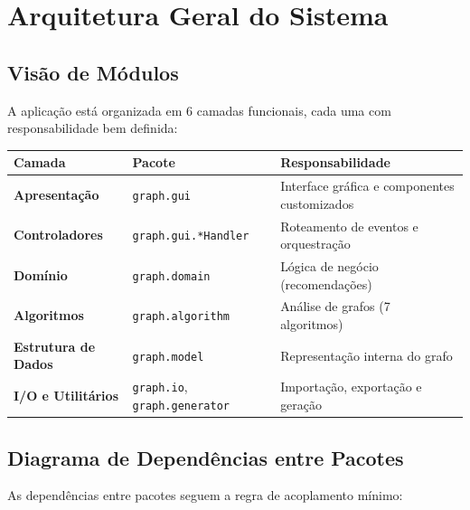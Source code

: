 \documentclass[12pt,a4paper]{article}
\begin{document}
    \newpage

    \section{Arquitetura Geral do Sistema}

    \subsection{Visão de Módulos}

    A aplicação está organizada em 6 camadas funcionais, cada uma com responsabilidade bem definida:

    \begin{table}[h]
        \centering
        \begin{tabular}{|l|l|l|}
            \hline
            \textbf{Camada} & \textbf{Pacote} & \textbf{Responsabilidade} \\
            \hline
            \textbf{Apresentação} & \texttt{graph.gui} & Interface gráfica e componentes customizados \\
            \hline
            \textbf{Controladores} & \texttt{graph.gui.*Handler} & Roteamento de eventos e orquestração \\
            \hline
            \textbf{Domínio} & \texttt{graph.domain} & Lógica de negócio (recomendações) \\
            \hline
            \textbf{Algoritmos} & \texttt{graph.algorithm} & Análise de grafos (7 algoritmos) \\
            \hline
            \textbf{Estrutura de Dados} & \texttt{graph.model} & Representação interna do grafo \\
            \hline
            \textbf{I/O e Utilitários} & \texttt{graph.io}, \texttt{graph.generator} & Importação, exportação e geração \\
            \hline
        \end{tabular}
    \end{table}

    \subsection{Diagrama de Dependências entre Pacotes}

    As dependências entre pacotes seguem a regra de acoplamento mínimo:
\end{document}
